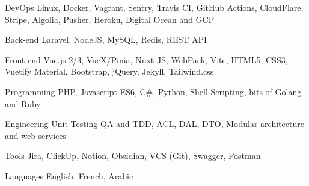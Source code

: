 

\begin{cvskills}

  \cvskill
    {DevOps} %
    {Linux, Docker, Vagrant, Sentry, Travis CI, GitHub Actions, CloudFlare, Stripe, Algolia, Pusher, Heroku, Digital Ocean and GCP} %

  \cvskill
    {Back-end} %
    {Laravel, NodeJS, MySQL, Redis, REST API} %

  \cvskill
    {Front-end} %
    {Vue.js 2/3, VueX/Pinia, Nuxt JS, WebPack, Vite, HTML5, CSS3, Vuetify Material, Bootstrap, jQuery, Jekyll, Tailwind.css} %

  \cvskill
    {Programming} %
    {PHP, Javascript ES6, C\#, Python, Shell Scripting, bits of Golang and Ruby} %

  \cvskill
    {Engineering} %
    {Unit Testing QA and TDD, ACL, DAL, DTO, Modular architecture and web services} %

  \cvskill
    {Tools} %
    {Jira, ClickUp, Notion, Obsidian, VCS (Git), Swagger, Postman} %


  \cvskill
    {Languages} %
    {English, French, Arabic} %

\end{cvskills}
